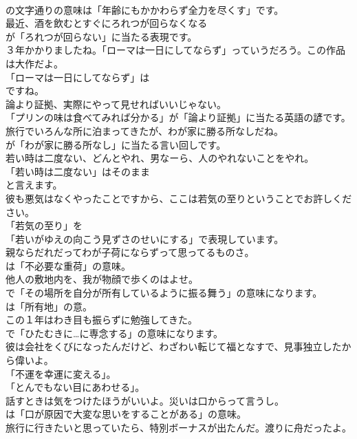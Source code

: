 \documentclass[8pt]{extreport}
\begin{document}
\begin{CJK}{UTF8}{min}
\\	の文字通りの意味は「年齢にもかかわらず全力を尽くす」です。	
\\	最近、酒を飲むとすぐにろれつが回らなくなる 
\\	が「ろれつが回らない」に当たる表現です。	
\\	３年かかりましたね。「ローマは一日にしてならず」っていうだろう。この作品は大作だよ。 
\\	「ローマは一日にしてならず」は
\\	ですね。	
\\	論より証拠、実際にやって見せればいいじゃない。 
\\	「プリンの味は食べてみれば分かる」が「論より証拠」に当たる英語の諺です。	
\\	旅行でいろんな所に泊まってきたが、わが家に勝る所なしだね。 
\\	が「わが家に勝る所なし」に当たる言い回しです。	
\\	若い時は二度ない、どんとやれ、男なーら、人のやれないことをやれ。 
\\	「若い時は二度ない」はそのまま
\\	と言えます。	
\\	彼も悪気はなくやったことですから、ここは若気の至りということでお許しください。 
\\	「若気の至り」を
\\	「若いがゆえの向こう見ずさのせいにする」で表現しています。	
\\	親ならだれだってわが子荷にならずって思ってるものさ。 
\\	は「不必要な重荷」の意味。	
\\	他人の敷地内を、我が物顔で歩くのはよせ。 
\\	で「その場所を自分が所有しているように振る舞う」の意味になります。
\\	は「所有地」の意。	
\\	この１年はわき目も振らずに勉強してきた。 
\\	で「ひたむきに…に専念する」の意味になります。	
\\	彼は会社をくびになったんだけど、わざわい転じて福となすで、見事独立したから偉いよ。 
\\	「不運を幸運に変える」。
\\	「とんでもない目にあわせる」。	
\\	話すときは気をつけたほうがいいよ。災いは口からって言うし。 
\\	は「口が原因で大変な思いをすることがある」の意味。	
\\	旅行に行きたいと思っていたら、特別ボーナスが出たんだ。渡りに舟だったよ。 

\end{CJK}
\end{document}
